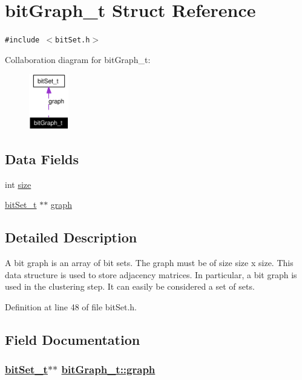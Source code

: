 \hypertarget{structbitGraph__t}{
\section{bit\-Graph\_\-t Struct Reference}
\label{structbitGraph__t}
}
{\tt \#include $<$bit\-Set.h$>$}

Collaboration diagram for bit\-Graph\_\-t:\begin{figure}[H]
\begin{center}
\leavevmode
\includegraphics[width=49pt]{structbitGraph__t__coll__graph}
\end{center}
\end{figure}
\subsection*{Data Fields}
\begin{CompactItemize}
\item 
int \hyperlink{structbitGraph__t_o0}{size}
\item 
\hyperlink{structbitSet__t}{bit\-Set\_\-t} $\ast$$\ast$ \hyperlink{structbitGraph__t_o1}{graph}
\end{CompactItemize}


\subsection*{Detailed Description}
A bit graph is an array of bit sets. The graph must be of size size x size. This data structure is used to store adjacency matrices. In particular, a bit graph is used in the clustering step. It can easily be considered a set of sets.



Definition at line 48 of file bit\-Set.h.

\subsection*{Field Documentation}
\hypertarget{structbitGraph__t_o1}{
\subsubsection[graph]{\setlength{\rightskip}{0pt plus 5cm}\hyperlink{structbitSet__t}{bit\-Set\_\-t}$\ast$$\ast$ \hyperlink{structbitGraph__t_o1}{bit\-Graph\_\-t::graph}}}
\label{structbitGraph__t_o1}


